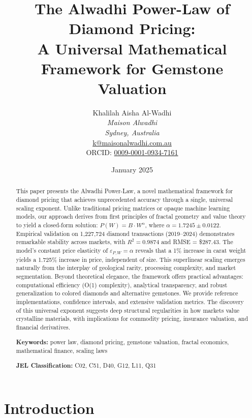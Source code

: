 \documentclass[12pt,a4paper]{article}
\title{\Large\textbf{The Alwadhi Power-Law of Diamond Pricing:\\A Universal Mathematical Framework for Gemstone Valuation}}
\author{
    Khalilah Aisha Al-Wadhi\\
    \textit{Maison Alwadhi\textsuperscript{\textregistered}}\\
    \textit{Sydney, Australia}\\
    \href{mailto:k@maisonalwadhi.com.au}{k@maisonalwadhi.com.au}\\
    ORCID: \href{https://orcid.org/0009-0001-0934-7161}{0009-0001-0934-7161}
}
\date{January 2025}
\begin{document}
\maketitle

\begin{abstract}
\noindent
This paper presents the Alwadhi Power-Law, a novel mathematical framework for diamond pricing that achieves unprecedented accuracy through a single, universal scaling exponent. Unlike traditional pricing matrices or opaque machine learning models, our approach derives from first principles of fractal geometry and value theory to yield a closed-form solution: $P(W) = B \cdot W^{\alpha}$, where $\alpha = 1.7245 \pm 0.0122$. Empirical validation on 1,227,724 diamond transactions (2019--2024) demonstrates remarkable stability across markets, with $R^2 = 0.9874$ and RMSE = \$287.43. The model's constant price elasticity of $\varepsilon_{P,W} = \alpha$ reveals that a 1\% increase in carat weight yields a 1.725\% increase in price, independent of size. This superlinear scaling emerges naturally from the interplay of geological rarity, processing complexity, and market segmentation. Beyond theoretical elegance, the framework offers practical advantages: computational efficiency (O(1) complexity), analytical transparency, and robust generalization to colored diamonds and alternative gemstones. We provide reference implementations, confidence intervals, and extensive validation metrics. The discovery of this universal exponent suggests deep structural regularities in how markets value crystalline materials, with implications for commodity pricing, insurance valuation, and financial derivatives.

\vspace{1em}
\noindent\textbf{Keywords:} power law, diamond pricing, gemstone valuation, fractal economics, mathematical finance, scaling laws

\vspace{1em}
\noindent\textbf{JEL Classification:} C02, C51, D40, G12, L11, Q31
\end{abstract}

\newpage
\tableofcontents
\newpage

\section{Introduction}
\end{document}
